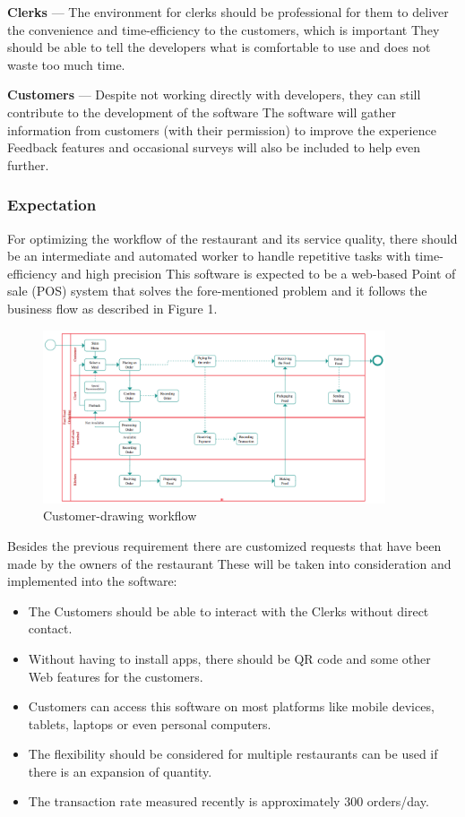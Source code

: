 \documentclass[a4paper]{article}
\numberwithin{equation}{section}
\begin{document}
\textbf{Clerks} --- The environment for clerks should be professional for them to deliver the convenience and time-efficiency to the customers, which is important
They should be able to tell the developers what is comfortable to use and does not waste too much time.

\textbf{Customers} --- Despite not working directly with developers, they can still contribute to the development of the software
The software will gather information from customers (with their permission) to improve the experience
Feedback features and occasional surveys will also be included to help even further.

\subsubsection{Expectation}
For optimizing the workflow of the restaurant and its service quality, there should be an intermediate and automated worker to handle repetitive tasks with time-efficiency and high precision
This software is expected to be a web-based Point of sale (POS) system that solves the fore-mentioned problem and it follows the business flow as described in Figure 1.

\begin{figure}[H]
  \centering
  \includegraphics[width=0.9\textwidth]{./assets/t1/customer_figure.png}
  \caption{Customer-drawing workflow}
\end{figure}

Besides the previous requirement there are customized requests that have been made by the owners of the restaurant
These will be taken into consideration and implemented into the software:

\begin{itemize}
  \item The Customers should be able to interact with the Clerks without direct contact.
  \item Without having to install apps, there should be QR code and some other Web features for the customers.
  \item Customers can access this software on most platforms like mobile devices, tablets, laptops or even personal computers.
  \item The flexibility should be considered for multiple restaurants can be used if there is an expansion of quantity.
  \item The transaction rate measured recently is approximately 300 orders/day.
\end{itemize}
\end{document}
